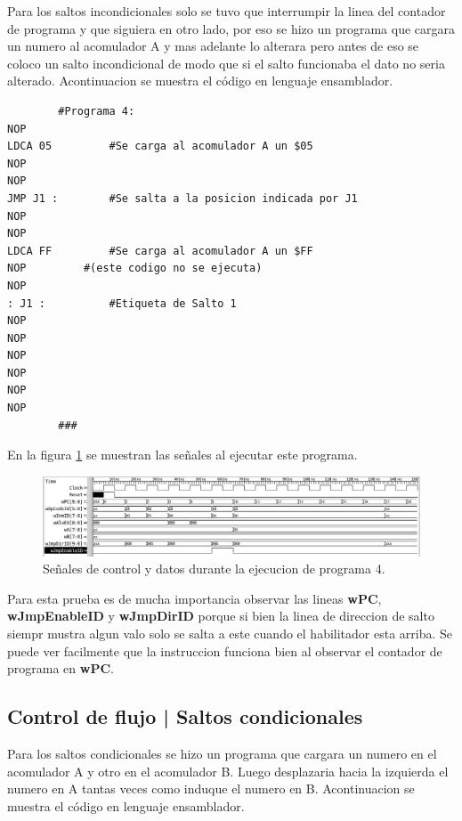 \documentclass[paper=letter, fontsize=12pt]{article}
\begin{document}
Para los saltos incondicionales solo se tuvo que interrumpir la linea del contador de programa y que siguiera en otro lado, por eso se hizo un programa que cargara un numero al acomulador A y mas adelante lo alterara pero antes de eso se coloco un salto incondicional de modo que si el salto funcionaba el dato no seria alterado. Acontinuacion se muestra el código en lenguaje ensamblador.

\begin{lstlisting}
		#Programa 4:
NOP
LDCA 05			#Se carga al acomulador A un $05
NOP
NOP
JMP J1 :		#Se salta a la posicion indicada por J1
NOP
NOP
LDCA FF			#Se carga al acomulador A un $FF
NOP			#(este codigo no se ejecuta)
NOP
: J1 :			#Etiqueta de Salto 1
NOP
NOP
NOP
NOP
NOP
NOP
		###
\end{lstlisting}

En la figura \ref{i:p4} se muestran las señales al ejecutar este programa.\\

\begin{figure}[hbtp]
\centering
\includegraphics[width=1\linewidth]{../test/Prog4.png}
\caption{Señales de control y datos durante la ejecucion de programa 4.}
\label{i:p4}
\end{figure}

Para esta prueba es de mucha importancia observar las lineas \textbf{wPC}, \textbf{wJmpEnableID} y \textbf{wJmpDirID} porque si bien la linea de direccion de salto siempr mustra algun valo solo se salta a este cuando el habilitador esta arriba. Se puede ver facilmente que la instruccion funciona bien al observar el contador de programa en \textbf{wPC}.

\subsection{Control de flujo | Saltos condicionales}

Para los saltos condicionales se hizo un programa que cargara un numero en el acomulador A y otro en el acomulador B. Luego desplazaria hacia la izquierda el numero en A tantas veces como induque el numero en B. Acontinuacion se muestra el código en lenguaje ensamblador.
\end{document}

